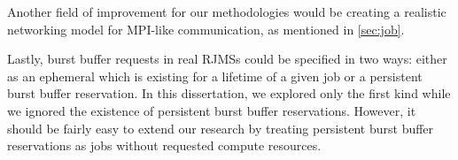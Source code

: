 \documentclass[thesis-en.tex]{subfiles}
\begin{document}
Another field of improvement for our methodologies would be creating a realistic networking model for MPI-like communication, as mentioned in \autoref{sec:job}. 

Lastly, burst buffer requests in real RJMSs could be specified in two ways: either as an ephemeral which is existing for a lifetime of a given job or a persistent burst buffer reservation. In this dissertation, we explored only the first kind while we ignored the existence of persistent burst buffer reservations. However, it should be fairly easy to extend our research by treating persistent burst buffer reservations as jobs without requested compute resources.
\end{document}
